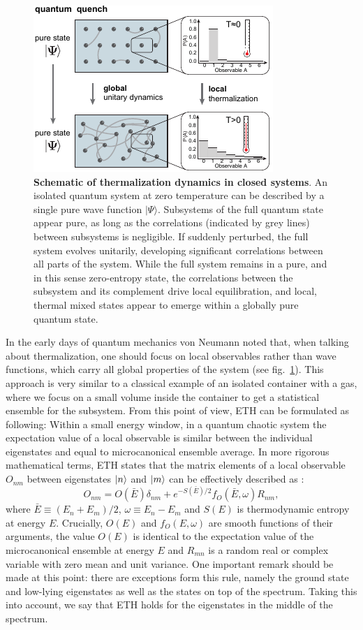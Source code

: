 \begin{figure}[t]
	\centering
	\includegraphics[scale=1.5]{figures/ETH_fig1.pdf}
	\caption{{\bf Schematic of thermalization dynamics in closed systems}.  An isolated quantum system at zero temperature can be described by a single pure wave function $\vert \Psi \rangle$. Subsystems of the full quantum state appear pure, as long as the correlations (indicated by grey lines) between subsystems is negligible. If suddenly perturbed, the full system evolves unitarily, developing significant correlations between all parts of the system. While the full system remains in a pure, and in this sense zero-entropy state, the correlations between the subsystem and its complement drive local equilibration, and local, thermal mixed states appear to emerge within a globally pure quantum state.  }
	\label{fig:ETH_conceptual}
\end{figure}

In the early days of quantum mechanics von Neumann noted that, when talking about thermalization, one should focus on local observables rather than wave functions, which carry all global properties of the system (see fig.~\ref{fig:ETH_conceptual}). This approach is very similar to a classical example of an isolated container with a gas, where we focus on a small volume inside the container to get a statistical ensemble for the subsystem. From this point of view, ETH can be formulated as following: Within a small energy window, in a quantum chaotic system the expectation value of a local observable is similar between the individual eigenstates and equal to microcanonical ensemble average. In more rigorous mathematical terms, ETH states that the matrix elements of a local observable $O_{nm}$ between eigenstates $\left|n\right\rangle$ and $\left|m\right\rangle$ can be effectively described as \cite{Srednicki1999}: 
\begin{equation}
O_{nm} = O(\bar{E}) \delta_{nm} + e^{-S(\bar{E})/2} f_O (\bar{E}, \omega) R_{nm},
\end{equation}
where $\bar{E} \equiv (E_n+E_m)/2$, $\omega \equiv E_n-E_m$ and $S(E)$ is thermodynamic entropy at energy $E$. Crucially, $O(E)$ and $f_O(E,\omega)$ are smooth functions of their arguments, the value $O(E)$ is identical to the expectation value of the microcanonical ensemble at energy $E$ and $R_{mn}$ is a random real or complex variable with zero mean and unit variance. One important remark should be made at this point: there are exceptions form this rule, namely the ground state and low-lying eigenstates as well as the states on top of the spectrum. Taking this into account, we say that ETH holds for the eigenstates in the middle of the spectrum. 

